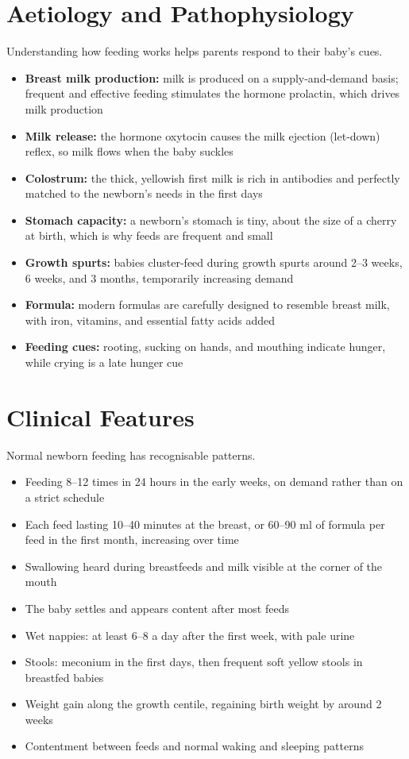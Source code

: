\section*{Aetiology and Pathophysiology}
Understanding how feeding works helps parents respond to their baby's cues.
\begin{itemize}
    \item \textbf{Breast milk production:} milk is produced on a supply-and-demand basis; frequent and effective feeding stimulates the hormone prolactin, which drives milk production
    \item \textbf{Milk release:} the hormone oxytocin causes the milk ejection (let-down) reflex, so milk flows when the baby suckles
    \item \textbf{Colostrum:} the thick, yellowish first milk is rich in antibodies and perfectly matched to the newborn's needs in the first days
    \item \textbf{Stomach capacity:} a newborn's stomach is tiny, about the size of a cherry at birth, which is why feeds are frequent and small
    \item \textbf{Growth spurts:} babies cluster-feed during growth spurts around 2--3 weeks, 6 weeks, and 3 months, temporarily increasing demand
    \item \textbf{Formula:} modern formulas are carefully designed to resemble breast milk, with iron, vitamins, and essential fatty acids added
    \item \textbf{Feeding cues:} rooting, sucking on hands, and mouthing indicate hunger, while crying is a late hunger cue
\end{itemize}

\section*{Clinical Features}
Normal newborn feeding has recognisable patterns.
\begin{itemize}
    \item Feeding 8--12 times in 24 hours in the early weeks, on demand rather than on a strict schedule
    \item Each feed lasting 10--40 minutes at the breast, or 60--90 ml of formula per feed in the first month, increasing over time
    \item Swallowing heard during breastfeeds and milk visible at the corner of the mouth
    \item The baby settles and appears content after most feeds
    \item Wet nappies: at least 6--8 a day after the first week, with pale urine
    \item Stools: meconium in the first days, then frequent soft yellow stools in breastfed babies
    \item Weight gain along the growth centile, regaining birth weight by around 2 weeks
    \item Contentment between feeds and normal waking and sleeping patterns
\end{itemize}


